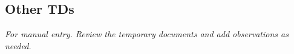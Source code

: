 \subsection{Other TDs}

\textit{For manual entry. Review the temporary documents and add observations as needed.}


